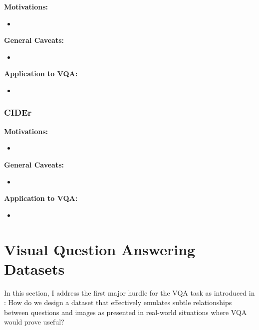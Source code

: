 \textbf{Motivations:}

\begin{itemize}
    \item 
\end{itemize}

\textbf{General Caveats:}

\begin{itemize}
    \item 
\end{itemize}

\textbf{Application to VQA:}
\begin{itemize}
    \item 
\end{itemize}

\subsubsection{CIDEr}

\textbf{Motivations:}

\begin{itemize}
    \item 
\end{itemize}

\textbf{General Caveats:}

\begin{itemize}
    \item 
\end{itemize}

\textbf{Application to VQA:}
\begin{itemize}
    \item 
\end{itemize}


\section{Visual Question Answering Datasets}
\label{section:vqa_datasets}

In this section, I address the first major hurdle for the VQA task as introduced in \chapterautorefname{  \ref{chapter:introduction}}: How do we design a dataset that effectively emulates subtle relationships between questions and images as presented in real-world situations where VQA would prove useful?


